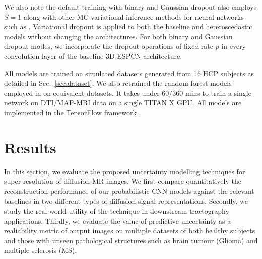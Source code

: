 We also note the default training with binary and Gaussian dropout also employs $S=1$ \cite {srivastava2014dropout} along with other MC variational inference methods for neural networks such as \cite{kingma2013auto,kingma2015variational,gal2017concrete}. Variational dropout is applied to both the baseline and heteroscedastic models without changing the architectures. For both binary and Gaussian dropout modes, we incorporate the dropout operations of fixed rate $p$ in every convolution layer of the baseline 3D-ESPCN architecture. 

All models are trained on simulated datasets generated from 16 HCP subjects as detailed in Sec.~\ref{sec:dataset}. We also retrained the random forest models employed in \cite{tanno2016bayesian,alexander2017image} on equivalent datasets. It takes under $60/360$ mins to train a single network on DTI/MAP-MRI data on a single TITAN X GPU. All models are implemented in the TensorFlow framework \cite{abadi2016tensorflow}.  


\section{Results}
In this section, we evaluate the proposed uncertainty modelling techniques for super-resolution of diffusion MR images. We first compare quantitatively the reconstruction performance of our probabilistic CNN models against the relevant baselines in two different types of diffusion signal representations. Secondly, we study the real-world utility of the technique in downstream tractography applications. Thirdly, we evaluate the value of predictive uncertainty as a realiability metric of output images on multiple datasets of both healthy subjects and those with unseen pathological structures such as brain tumour (Glioma) and multiple sclerosis (MS). 


